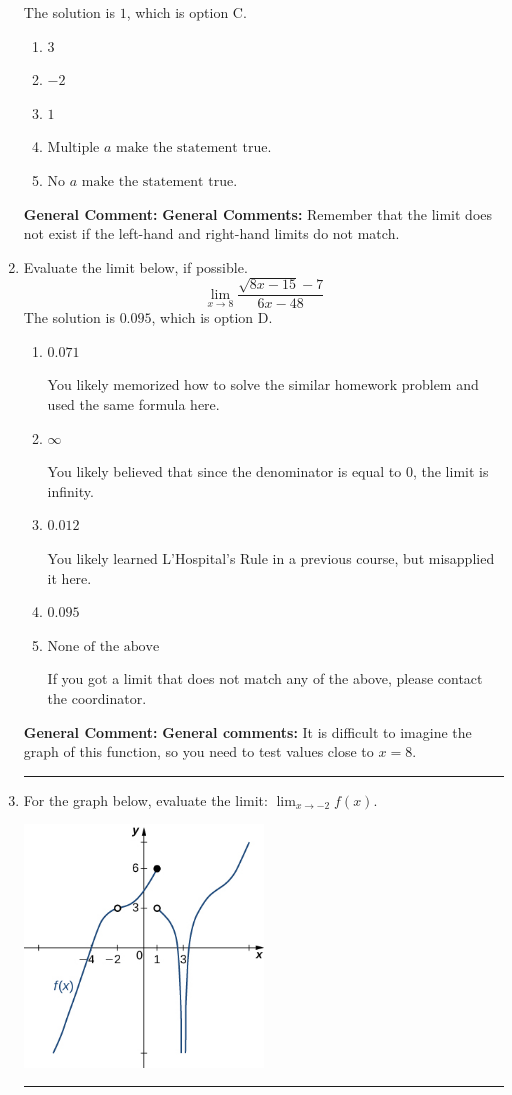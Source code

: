 \documentclass{extbook}[14pt]
\newcommand{\litem}[1]{\item #1

\rule{\textwidth}{0.4pt}}
\begin{document}
\begin{enumerate}
{The solution is \( 1 \), which is option C.\begin{enumerate}[label=\Alph*.]
\item \( 3 \)


\item \( -2 \)


\item \( 1 \)


\item \( \text{Multiple } a \text{ make the statement true}. \)


\item \( \text{No } a \text{ make the statement true}. \)


\end{enumerate}

\textbf{General Comment:} \textbf{General Comments:} Remember that the limit does not exist if the left-hand and right-hand limits do not match.
}
\litem{
Evaluate the limit below, if possible.
\[ \lim_{x \rightarrow 8} \frac{\sqrt{8x - 15} - 7}{6x - 48} \]The solution is \( 0.095 \), which is option D.\begin{enumerate}[label=\Alph*.]
\item \( 0.071 \)

You likely memorized how to solve the similar homework problem and used the same formula here.
\item \( \infty \)

You likely believed that since the denominator is equal to 0, the limit is infinity.
\item \( 0.012 \)

You likely learned L'Hospital's Rule in a previous course, but misapplied it here.
\item \( 0.095 \)


\item \( \text{None of the above} \)

If you got a limit that does not match any of the above, please contact the coordinator.
\end{enumerate}

\textbf{General Comment:} \textbf{General comments:} It is difficult to imagine the graph of this function, so you need to test values close to $x = 8$.
}
\litem{
For the graph below, evaluate the limit: $ \displaystyle \lim_{x \rightarrow -2} f(x)$.

\begin{center}
    \includegraphics[width=0.5\textwidth]{../Figures/evaluateLimitGraphicallyB.png}
\end{center}


}
\end{enumerate}
\end{document}
